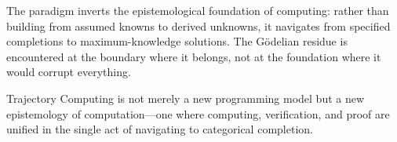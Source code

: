 \documentclass[twocolumn,10pt]{article}
\theoremstyle{remark}
\begin{document}
The paradigm inverts the epistemological foundation of computing: rather than building from assumed knowns to derived unknowns, it navigates from specified completions to maximum-knowledge solutions. The Gödelian residue is encountered at the boundary where it belongs, not at the foundation where it would corrupt everything.

Trajectory Computing is not merely a new programming model but a new epistemology of computation---one where computing, verification, and proof are unified in the single act of navigating to categorical completion.



\end{document}
